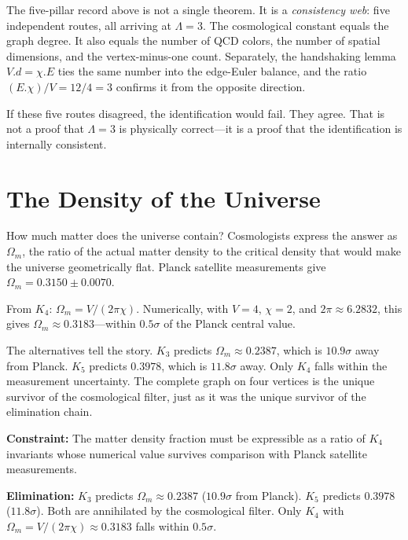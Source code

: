 \documentclass[11pt,a4paper]{book}
\def\cdot{.}%
\begin{document}
The five-pillar record above is not a single theorem. It is a \emph{consistency web}: five independent routes, all arriving at $\Lambda = 3$. The cosmological constant equals the graph degree. It also equals the number of QCD colors, the number of spatial dimensions, and the vertex-minus-one count. Separately, the handshaking lemma $V \cdot d = \chi \cdot E$ ties the same number into the edge-Euler balance, and the ratio $(E \cdot \chi)/V = 12/4 = 3$ confirms it from the opposite direction.

If these five routes disagreed, the identification would fail. They agree. That is not a proof that $\Lambda = 3$ is physically correct---it is a proof that the identification is internally consistent.

\chapter{The Density of the Universe}
\label{ch:density-parameter}

How much matter does the universe contain? Cosmologists express the answer as $\Omega_m$, the ratio of the actual matter density to the critical density that would make the universe geometrically flat. Planck satellite measurements give $\Omega_m = 0.3150 \pm 0.0070$.

From $K_4$: $\Omega_m = V / (2\pi\chi)$. Numerically, with $V = 4$, $\chi = 2$, and $2\pi \approx 6.2832$, this gives $\Omega_m \approx 0.3183$---within $0.5\sigma$ of the Planck central value.

The alternatives tell the story. $K_3$ predicts $\Omega_m \approx 0.2387$, which is $10.9\sigma$ away from Planck. $K_5$ predicts $0.3978$, which is $11.8\sigma$ away. Only $K_4$ falls within the measurement uncertainty. The complete graph on four vertices is the unique survivor of the cosmological filter, just as it was the unique survivor of the elimination chain.

\textbf{Constraint:} The matter density fraction must be expressible as a ratio of $K_4$ invariants whose numerical value survives comparison with Planck satellite measurements.

\textbf{Elimination:} $K_3$ predicts $\Omega_m \approx 0.2387$ ($10.9\sigma$ from Planck). $K_5$ predicts $0.3978$ ($11.8\sigma$). Both are annihilated by the cosmological filter. Only $K_4$ with $\Omega_m = V/(2\pi\chi) \approx 0.3183$ falls within $0.5\sigma$.
\end{document}
